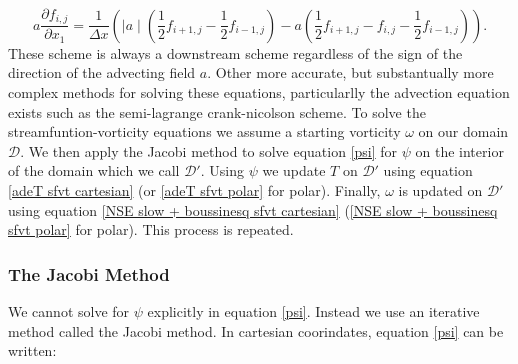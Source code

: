 \documentclass{article}
\begin{document}
\begin{equation}
	a \frac{\partial f_{i,j}}{\partial x_1} = \frac{1}{\Delta x} ( \mid a\mid (  \frac{1}{2} f_{i+1,j} - \frac{1}{2} f_{i-1,j}   ) - a ( \frac{1}{2} f_{i+1,j} -f_{i,j} - \frac{1}{2} f_{i-1,j} )).
\end{equation}
These scheme is always a downstream scheme regardless of the sign of the direction of the advecting field $a$.
\newline
Other more accurate, but substantually more complex methods for solving these equations, particularlly the advection equation exists such as the semi-lagrange crank-nicolson scheme.
\newline
To solve the streamfuntion-vorticity equations we assume a starting vorticity $\omega$ on our domain $\mathcal{D}$. We then apply the Jacobi method to solve equation \ref{psi} for $\psi$ on the interior of the domain which we call $\mathcal{D}'$. 
Using $\psi$ we update $T$ on $\mathcal{D}'$ using equation \ref{adeT sfvt cartesian} (or \ref{adeT sfvt polar} for polar). Finally, $\omega$ is updated on $\mathcal{D}'$ using 
equation \ref{NSE slow + boussinesq sfvt cartesian} (\ref{NSE slow + boussinesq sfvt polar} for polar). This process is repeated.

\subsubsection*{The Jacobi Method}
We cannot solve for $\psi$ explicitly in equation \ref{psi}. Instead we use an iterative method called the Jacobi method. In cartesian coorindates, equation \ref{psi} can be written:
\end{document}
